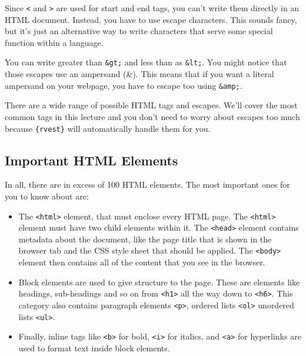 \documentclass[
  12pt,
]{book}
\begin{document}
Since \texttt{\textless{}} and \texttt{\textgreater{}} are used for start and end tags, you can't write them directly in an HTML document. Instead, you have to use escape characters. This sounds fancy, but it's just an alternative way to write characters that serve some special function within a language.

You can write greater than \texttt{\&gt;} and less than as \texttt{\&lt;}. You might notice that those escapes use an ampersand (\&). This means that if you want a literal ampersand on your webpage, you have to escape too using \texttt{\&amp;}.

There are a wide range of possible HTML tags and escapes. We'll cover the most common tags in this lecture and you don't need to worry about escapes too much because \texttt{\{rvest\}} will automatically handle them for you.

\hypertarget{important-html-elements}{%
\subsection{Important HTML Elements}\label{important-html-elements}}

In all, there are in excess of 100 HTML elements. The most important ones for you to know about are:

\begin{itemize}
\item
  The \texttt{\textless{}html\textgreater{}} element, that must enclose every HTML page. The \texttt{\textless{}html\textgreater{}} element must have two child elements within it. The \texttt{\textless{}head\textgreater{}} element contains metadata about the document, like the page title that is shown in the browser tab and the CSS style sheet that should be applied. The \texttt{\textless{}body\textgreater{}} element then contains all of the content that you see in the browser.
\item
  Block elements are used to give structure to the page. These are elements like headings, sub-headings and so on from \texttt{\textless{}h1\textgreater{}} all the way down to \texttt{\textless{}h6\textgreater{}}. This category also contains paragraph elements \texttt{\textless{}p\textgreater{}}, ordered lists \texttt{\textless{}ol\textgreater{}} unordered lists \texttt{\textless{}ul\textgreater{}}.
\item
  Finally, inline tags like \texttt{\textless{}b\textgreater{}} for bold, \texttt{\textless{}i\textgreater{}} for italics, and \texttt{\textless{}a\textgreater{}} for hyperlinks are used to format text inside block elements.
\end{itemize}
\end{document}

